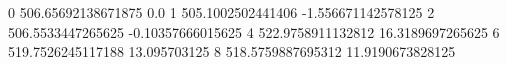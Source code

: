 0 506.65692138671875 0.0
1 505.1002502441406 -1.556671142578125
2 506.5533447265625 -0.10357666015625
4 522.9758911132812 16.3189697265625
6 519.7526245117188 13.095703125
8 518.5759887695312 11.9190673828125
